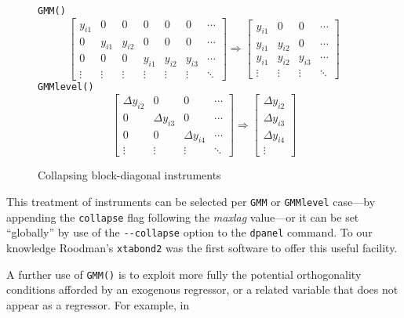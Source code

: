 \begin{figure}[htbp]
  \centering
  \texttt{GMM()}
  \[
    \left[
      \begin{array}{ccccccc}
        y_{i1} & 0 & 0 & 0 & 0 & 0 & \cdots \\
        0 & y_{i1} & y_{i2} & 0 & 0 & 0 & \cdots \\
        0 & 0 & 0 & y_{i1} & y_{i2} & y_{i3} & \cdots \\
        \vdots & \vdots & \vdots & \vdots & \vdots & \vdots & \ddots
      \end{array}
    \right]
    \Longrightarrow
    \left[
      \begin{array}{cccc}
        y_{i1} & 0 & 0 & \cdots \\
        y_{i1} & y_{i2} & 0 & \cdots \\
        y_{i1} & y_{i2} & y_{i3} & \cdots \\
        \vdots & \vdots & \vdots & \ddots
      \end{array}
    \right]
  \]
  \texttt{GMMlevel()}
  \[
    \left[
      \begin{array}{cccc}
        \Delta y_{i2} & 0 & 0 & \cdots \\
        0 & \Delta y_{i3} & 0 & \cdots \\
        0 & 0 & \Delta y_{i4} & \cdots \\
        \vdots & \vdots & \vdots & \ddots
      \end{array}
    \right]
    \Longrightarrow
    \left[
      \begin{array}{c}
        \Delta y_{i2} \\
        \Delta y_{i3} \\
        \Delta y_{i4} \\
        \vdots
      \end{array}
    \right]
  \]
  \caption{Collapsing block-diagonal instruments}
  \label{fig:collapse}
\end{figure}

This treatment of instruments can be selected per \texttt{GMM} or
\texttt{GMMlevel} case---by appending the \texttt{collapse} flag
following the \textsl{maxlag} value---or it can be set ``globally'' by
use of the \verb|--collapse| option to the \texttt{dpanel} command.
To our knowledge Roodman's \texttt{xtabond2} was the first software to
offer this useful facility.

A further use of \texttt{GMM()} is to exploit more fully the potential
orthogonality conditions afforded by an exogenous regressor, or a
related variable that does not appear as a regressor.  For example, in

